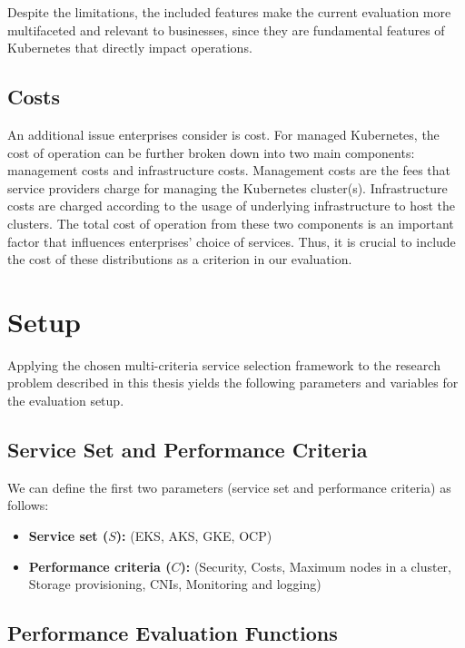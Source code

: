 Despite the limitations, the included features make the current evaluation more multifaceted and relevant to businesses, since they are fundamental features of Kubernetes that directly impact operations.

\subsection{Costs}

An additional issue enterprises consider is cost. For managed Kubernetes, the cost of operation can be further broken down into two main components: management costs and infrastructure costs. Management costs are the fees that service providers charge for managing the Kubernetes cluster(s). Infrastructure costs are charged according to the usage of underlying infrastructure to host the clusters. The total cost of operation from these two components is an important factor that influences enterprises' choice of services. Thus, it is crucial to include the cost of these distributions as a criterion in our evaluation.


\section{Setup}\label{evaluation-setup}

Applying the chosen multi-criteria service selection framework to the research problem described in this thesis yields the following parameters and variables for the evaluation setup.

\subsection{Service Set and Performance
Criteria}\label{service-set-and-performance-criteria}

We can define the first two parameters (service set and performance criteria) as follows:

\begin{itemize}
\tightlist
\item
  \textbf{Service set (\(S\)):} (EKS, AKS, GKE, OCP)
\item
  \textbf{Performance criteria (\(C\)):} (Security, Costs, Maximum nodes
  in a cluster, Storage provisioning, CNIs, Monitoring and logging)
\end{itemize}

\subsection{Performance Evaluation
Functions}\label{performance-evaluation-functions}

